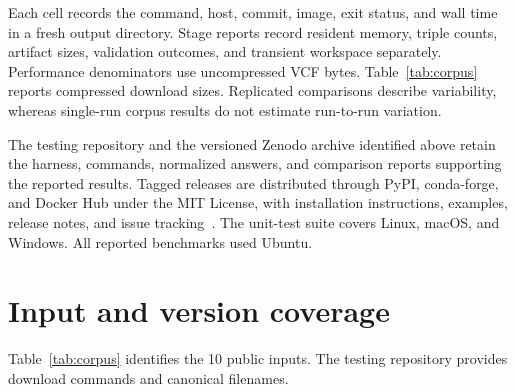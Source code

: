 \documentclass[11pt]{article}
\begin{document}
Each cell records the command, host, commit, image, exit status, and wall time in a fresh output directory.
Stage reports record resident memory, triple counts, artifact sizes, validation outcomes, and transient workspace separately.
Performance denominators use uncompressed VCF bytes.
Table~\ref{tab:corpus} reports compressed download sizes.
Replicated comparisons describe variability, whereas single-run corpus results do not estimate run-to-run variation.

The testing repository and the versioned Zenodo archive identified above retain the harness, commands, normalized answers, and comparison reports supporting the reported results.
Tagged releases are distributed through PyPI, conda-forge, and Docker Hub under the MIT License, with installation instructions, examples, release notes, and issue tracking~\cite{jimenez_2017_f1000}.
The unit-test suite covers Linux, macOS, and Windows.
All reported benchmarks used Ubuntu.

\section{Input and version coverage}\label{sec:inputs}
Table~\ref{tab:corpus} identifies the 10 public inputs.
The testing repository provides download commands and canonical filenames.
\end{document}
